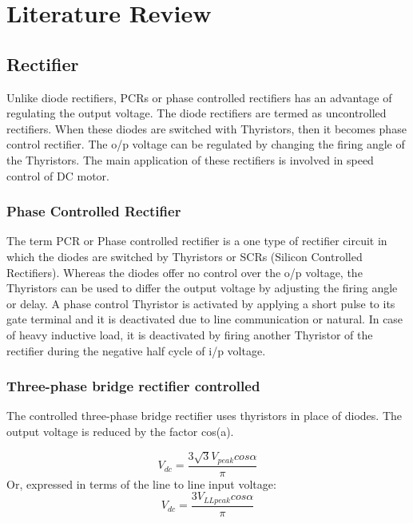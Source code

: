 
\chapter{Literature Review} %
\label{Chapter1}

\section{Rectifier}
Unlike diode rectifiers, PCRs or phase controlled rectifiers
has an advantage of regulating the output voltage. The diode
rectifiers are termed as uncontrolled rectifiers. When 
these diodes are switched with Thyristors, then it becomes 
phase control rectifier. The o/p voltage can be regulated 
by changing the firing angle of the Thyristors. The main 
application of these rectifiers is involved in speed control 
of DC motor.
\subsection{Phase Controlled Rectifier}
The term PCR or Phase controlled rectifier is a one type of 
rectifier circuit in which the diodes are switched by Thyristors 
or SCRs (Silicon Controlled Rectifiers). Whereas the diodes offer
no control over the o/p voltage, the Thyristors can be used 
to differ the output voltage by adjusting the firing angle or 
delay. A phase control Thyristor is activated by applying a short 
pulse to its gate terminal and it is deactivated due to line 
communication or natural. In case of heavy inductive load, it is 
deactivated by firing another Thyristor of the rectifier during 
the negative half cycle of i/p voltage.

\subsection{Three-phase bridge rectifier controlled}
The controlled three-phase bridge rectifier uses thyristors in 
place of diodes. The output voltage is reduced by the factor cos(a).

\begin{equation}
	V_{dc}=\frac{3\sqrt{3}V_{peak} cos{\alpha} }{\pi}
\end{equation}
Or, expressed in terms of the line to line input voltage:
\begin{equation}
	V_{dc}=\frac{3V_{LLpeak} cos{\alpha} }{\pi}
\end{equation}

